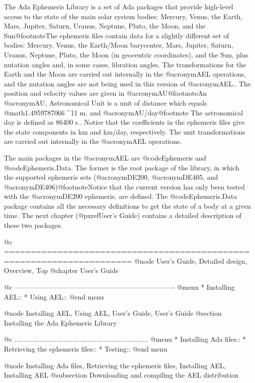 The Ada Ephemeris Library is a set of Ada packages that provide
high-level access to the state of the main solar system bodies:
Mercury, Venus, the Earth, Mars, Jupiter, Saturn, Uranus, Neptune,
Pluto, the Moon, and the Sun@footnote{The ephemeris files contain data
for a slightly different set of bodies: Mercury, Venus, the Earth/Moon
barycenter, Mars, Jupiter, Saturn, Uranus, Neptune, Pluto, the Moon
(in geocentric coordinates), and the Sun, plus nutation angles and, in
some cases, libration angles. The transformations for the Earth and
the Moon are carried out internally in the @acronym{AEL} operations,
and the nutation angles are not being used in this version of
@acronym{AEL}.}. The position and velocity values are given in
@acronym{AU}@footnote{An @acronym{AU, Astronomical Unit} is a unit of
distance which equals @math{1.4959787066 ^{11}} m.} and
@acronym{AU}/day@footnote{ The astronomical day is defined as 86400
s.}. Notice that the coefficients in the ephemeris files give the
state components in km and km/day, respectively. The unit
transformations are carried out internally in the @acronym{AEL}
operations.

The main packages in the @acronym{AEL} are @code{Ephemeris} and
@code{Ephemeris.Data}. The former is the root package of the library,
in which the supported ephemeris sets (@acronym{DE200},
@acronym{DE405}, and @acronym{DE406})@footnote{Notice that the current
version has only been tested with the @acronym{DE200} ephemeris.} are
defined.  The @code{Ephemeris.Data} package contains all the necessary
definitions to get the state of a body at a given time. The next
chapter (@pxref{User's Guide}) contains a detailed description of
these two packages.

@c ======================================================================
@node  User's Guide, Detailed design, Overview, Top
@chapter User's Guide 

@c ----------------------------------------------------------------------
@menu
* Installing AEL::              
* Using AEL::                   
@end menu

@node Installing AEL, Using AEL, User's Guide, User's Guide
@section Installing the Ada Ephemeris Library

@c ......................................................................
@menu
* Installing Ada files::        
* Retrieving the ephemeris files::  
* Testing::                     
@end menu

@node Installing Ada files, Retrieving the ephemeris files, Installing AEL, Installing AEL
@subsection Downloading and compiling the AEL distribution


